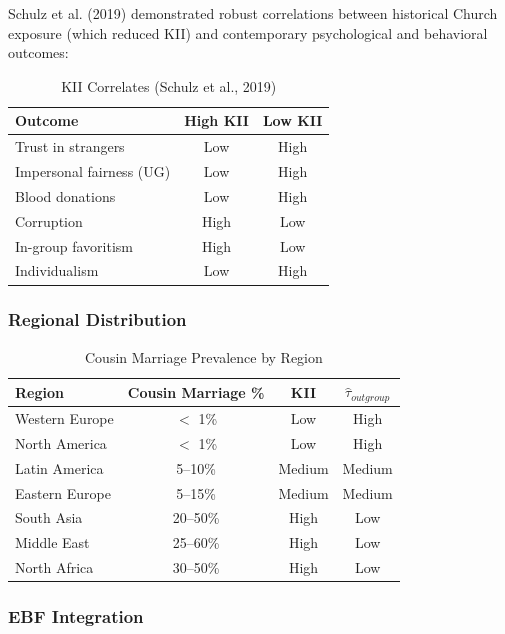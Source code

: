 Schulz et al. (2019) demonstrated robust correlations between historical Church exposure (which reduced KII) and contemporary psychological and behavioral outcomes:

\begin{table}[htbp]
\centering
\caption{KII Correlates (Schulz et al., 2019)}
\label{tab:kii-correlates}
\begin{tabular}{@{}lcc@{}}
\toprule
\textbf{Outcome} & \textbf{High KII} & \textbf{Low KII} \\
\midrule
Trust in strangers & Low & High \\
Impersonal fairness (UG) & Low & High \\
Blood donations & Low & High \\
Corruption & High & Low \\
In-group favoritism & High & Low \\
Individualism & Low & High \\
\bottomrule
\end{tabular}
\end{table}

\subsubsection{Regional Distribution}

\begin{table}[htbp]
\centering
\caption{Cousin Marriage Prevalence by Region}
\label{tab:cousin-marriage}
\begin{tabular}{@{}lccc@{}}
\toprule
\textbf{Region} & \textbf{Cousin Marriage \%} & \textbf{KII} & $\hat{\tau}_{outgroup}$ \\
\midrule
Western Europe & $<$ 1\% & Low & High \\
North America & $<$ 1\% & Low & High \\
Latin America & 5--10\% & Medium & Medium \\
Eastern Europe & 5--15\% & Medium & Medium \\
South Asia & 20--50\% & High & Low \\
Middle East & 25--60\% & High & Low \\
North Africa & 30--50\% & High & Low \\
\bottomrule
\end{tabular}
\end{table}

\subsubsection{EBF Integration}

